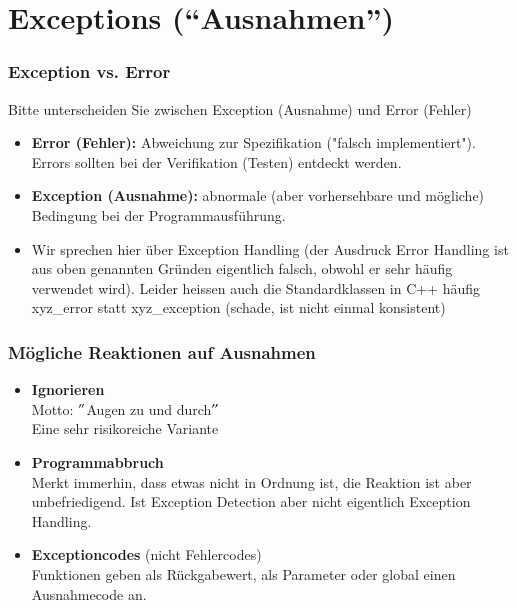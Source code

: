 
\part{Exceptions ("`Ausnahmen"')}

\section{Exception vs. Error}
\label{sec:Exception vs. Error}
Bitte unterscheiden Sie zwischen Exception (Ausnahme) und Error (Fehler)\\
\begin{itemize}
	\item \textbf{Error (Fehler):} Abweichung zur Spezifikation ("falsch implementiert"). Errors sollten bei der Verifikation (Testen) entdeckt werden.
	\item \textbf{Exception (Ausnahme):} abnormale (aber vorhersehbare und mögliche) Bedingung bei der Programmausführung.
	\item Wir sprechen hier über Exception Handling (der Ausdruck Error Handling ist aus oben genannten Gründen eigentlich falsch, obwohl er sehr häufig verwendet wird). Leider heissen auch die Standardklassen in C++ häufig xyz\_error statt xyz\_exception (schade, ist nicht einmal konsistent)
\end{itemize}

\section{Mögliche Reaktionen auf Ausnahmen}
\label{sec:Moegliche Reaktionen auf Ausnahmen}
\begin{itemize}
	\item \textbf{Ignorieren}\\
		Motto: $"$Augen zu und durch$"$\\
		Eine sehr risikoreiche Variante
	\item \textbf{Programmabbruch}\\
		Merkt immerhin, dass etwas nicht in Ordnung ist, die Reaktion ist aber unbefriedigend. Ist Exception Detection aber nicht eigentlich Exception Handling.
	\item \textbf{Exceptioncodes} (nicht Fehlercodes)\\
		Funktionen geben als Rückgabewert, als Parameter oder global einen Ausnahmecode an.
\end{itemize}


